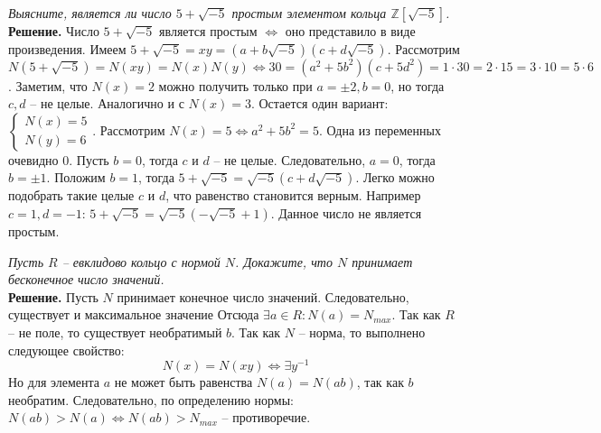 \documentclass[a4paper, 12pt]{article}
\newcommand{\Z}{\mathbb{Z}}
\newcommand{\N}{\mathbb{N}}
\begin{document}
\begin{spacing}{1}
\begin{center}
\end{center}

\noindent \textit{Выясните, является ли число $5+\sqrt{-5}$ простым элементом кольца $\Z[\sqrt{-5}]$.}\\
\noindent \textbf{Решение.} Число $5+\sqrt{-5}$ является простым $\Leftrightarrow$ оно представило в виде произведения. Имеем $5+\sqrt{-5} = xy =(a + b\sqrt{-5})(c + d\sqrt{-5})$. Рассмотрим $N(5+\sqrt{-5})= N(xy) = N(x)N(y) \Leftrightarrow30 = (a^2 + 5b^2)(c + 5d^2) = 1 \cdot 30 = 2 \cdot 15 = 3 \cdot 10 = 5\cdot 6$. Заметим, что $N(x) = 2$ можно получить только при $a = \pm2, b = 0$, но тогда $c, d$ -- не целые. Аналогично и с $N(x) = 3$. Остается один вариант: $\begin{cases}
N(x) = 5\\N(y) = 6
\end{cases}$. Рассмотрим $N(x) = 5 \Leftrightarrow a^2 + 5b^2 = 5$. Одна из переменных очевидно 0. Пусть $b = 0$, тогда $c$ и $d$ -- не целые. Следовательно, $a = 0$, тогда $b = \pm 1$. Положим $b = 1$, тогда $5+\sqrt{-5} = \sqrt{-5}(c + d\sqrt{-5})$. Легко можно подобрать такие целые $c$ и $d$, что равенство становится верным. Например $c = 1, d = -1$:
$5+\sqrt{-5} = \sqrt{-5}(-\sqrt{-5} + 1)$. Данное число не является простым.
\end{spacing}



\begin{center}
\end{center}

\noindent \textit{Пусть $R$ -- евклидово кольцо с нормой $N$. Докажите, что $N$ принимает бесконечное число значений.}\\
\noindent \textbf{Решение.} Пусть $N$ принимает конечное число значений. Следовательно, существует и максимальное значение Отсюда $\exists a \in R: N(a) = N_{max}$. Так как $R$ -- не поле, то существует необратимый $b$. Так как $N$ -- норма, то выполнено следующее свойство:
$$
N(x) = N(xy) \Leftrightarrow \exists y^{-1}
$$
Но для элемента $a$ не может быть равенства $N(a) = N(ab)$, так как $b$ необратим. Следовательно, по определению нормы: $N(ab) > N(a) \Leftrightarrow N(ab) > N_{max}$ -- противоречие. 
\end{document}
